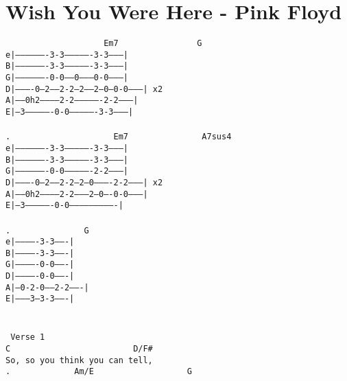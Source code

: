 \newpage
\section{Wish You Were Here - Pink Floyd}
\label{Wish You Were Here - Pink Floyd}
\texttt{\ \ \ \ \ \ \ \ \ \ \ \ \ \ \ \ \ \ \ \ Em7\ \ \ \ \ \ \ \ \ \ \ \ \ \ \ \ G\\
e|-------------------3-3----------------3-3---------|\\
B|-------------------3-3----------------3-3---------|\\
G|-------------------0-0------0---------0-0---------|\\
D|----------0--2-----2-2---2-----2--0---0-0---------|\ x2\\
A|-----0h2-----------2-2----------------2-2---------|\\
E|--3----------------0-0----------------3-3---------|\\
\\
. \ \ \ \ \ \ \ \ \ \ \ \ \ \ \ \ \ \ \ \ Em7\ \ \ \ \ \ \ \ \ \ \ \ \ \ \ A7sus4\\
e|-------------------3-3----------------3-3---------|\\
B|-------------------3-3----------------3-3---------|\\
G|-------------------0-0----------------2-2---------|\\
D|----------0--2-----2-2--2--0----------2-2---------|\ x2\\
A|-----0h2-----------2-2--------2--0----0-0---------|\\
E|--3----------------0-0----------------------------|\\
\\
. \ \ \ \ \ \ \ \ \ \ \ \ \ \ G\\
e|-------------3-3-------|\\
B|-------------3-3-------|\\
G|-------------0-0-------|\\
D|-------------0-0-------|\\
A|--0-2-0------2-2-------|\\
E|---------3---3-3-------|\\
\\
\\
\lbrack\ Verse\ 1\rbrack\\
C\ \ \ \ \ \ \ \ \ \ \ \ \ \ \ \ \ \ \ \ \ \ \ \ \ D/F\#\\
So,\ so\ you\ think\ you\ can\ tell,\\
. \ \ \ \ \ \ \ \ \ \ \ \ Am/E\ \ \ \ \ \ \ \ \ \ \ \ \ \ \ \ \ \ \ G\\
}
